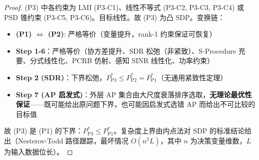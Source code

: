 \documentclass[12pt,a4paper]{article}
\begin{document}
\begin{proof}
(P3) 中各约束为 LMI (P3-C1)、线性不等式 (P3-C2, P3-C3, P3-C4) 或 PSD 锥约束 (P3-C5, P3-C6)。目标线性。故 (P3) 为凸 SDP。变换链：
\begin{itemize}
    \item \textbf{(P1) $\Leftrightarrow$ (P2)}: 严格等价（变量提升，rank-1 约束保证可恢复）
    \item \textbf{Step 1-6}：严格等价（协方差提升、SDR 松弛（非紧致）、S-Procedure 充要、分式线性化、PCRB 仿射、感知 SINR 线性化、功率约束）
    \item \textbf{Step 2 (SDR)}：下界松弛，$P_{\text{P3}}^* \leq P_{\text{P2}}^* = P_{\text{P1}}^*$（无通用紧致性定理）
    \item \textbf{Step 7 (AP 启发式)}：外层 AP 集合由大尺度衰落排序选取，\textbf{无理论最优性保证}——既可能给出原问题下界，也可能因启发式选错 AP 而给出不可比较的目标值
\end{itemize}
故 (P3) 是 (P1) 的下界：$P_{\text{P3}}^* \leq P_{\text{P1}}^*$。复杂度上界由内点法对 SDP 的标准结论给出（Nesterov-Todd 路径跟踪，最坏情况 $O(n^3 L)$，其中 $n$ 为决策变量维数，$L$ 为输入数据位长）。
\end{proof}
\end{document}
